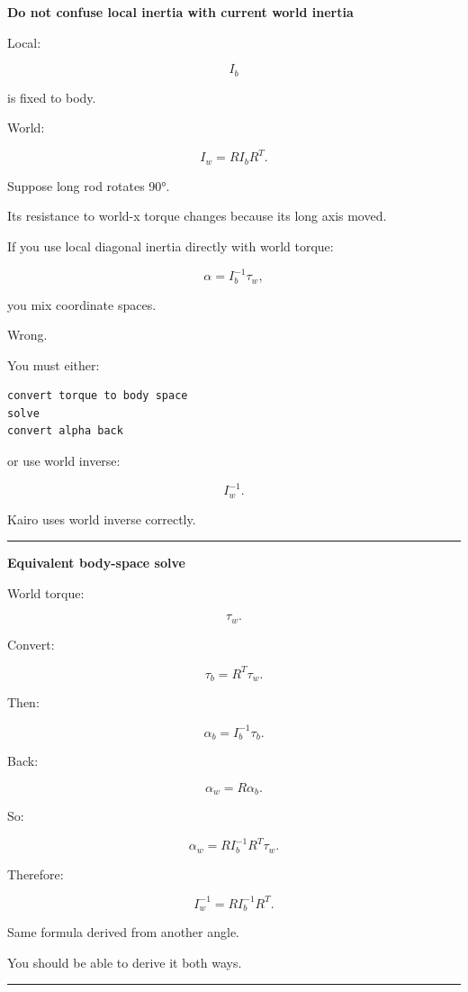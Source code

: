 \textbf{Do not confuse local inertia with current world inertia}

Local:

\[
I_b
\]

is fixed to body.

World:

\[
I_w=RI_bR^T.
\]

Suppose long rod rotates 90°.

Its resistance to world-x torque changes because its long axis moved.

If you use local diagonal inertia directly with world torque:

\[
\alpha=
I_b^{-1}\tau_w,
\]

you mix coordinate spaces.

Wrong.

You must either:

\begin{verbatim}
convert torque to body space
solve
convert alpha back
\end{verbatim}

or use world inverse:

\[
I_w^{-1}.
\]

Kairo uses world inverse correctly.

\begin{center}\rule{0.5\linewidth}{0.5pt}\end{center}

\textbf{Equivalent body-space solve}

World torque:

\[
\tau_w.
\]

Convert:

\[
\tau_b=R^T\tau_w.
\]

Then:

\[
\alpha_b=I_b^{-1}\tau_b.
\]

Back:

\[
\alpha_w=R\alpha_b.
\]

So:

\[
\alpha_w
=
RI_b^{-1}R^T\tau_w.
\]

Therefore:

\[
I_w^{-1}
=
RI_b^{-1}R^T.
\]

Same formula derived from another angle.

You should be able to derive it both ways.

\begin{center}\rule{0.5\linewidth}{0.5pt}\end{center}

